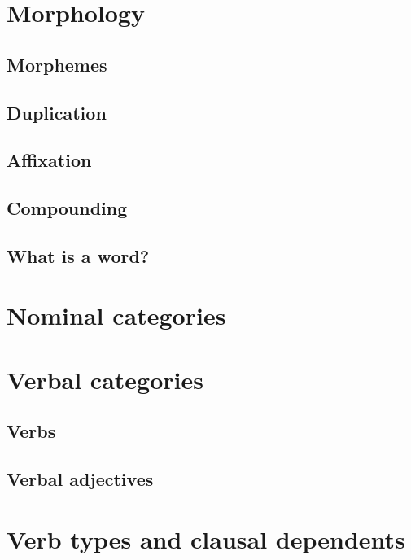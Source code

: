 \documentclass[UTF8, a4paper, oneside, scheme=plain]{ctexart}
\begin{document}
\section{Morphology}

\subsection{Morphemes}

\subsection{Duplication}\label{sec:duplication}

\subsection{Affixation}

\subsection{Compounding}

\subsection{What is a word?}

\section{Nominal categories}

\section{Verbal categories}

\subsection{Verbs}

\subsection{Verbal adjectives}

\section{Verb types and clausal dependents}

\end{document}
